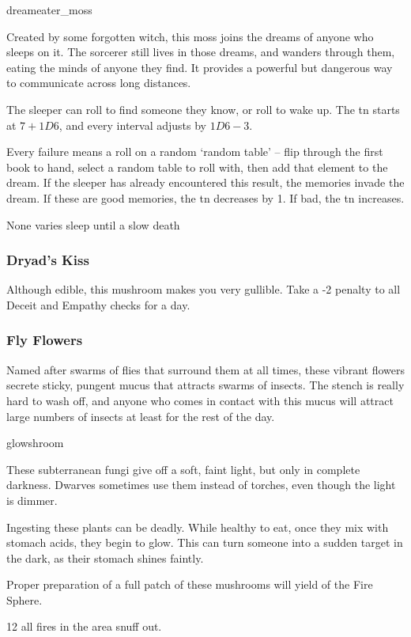 \begin{multicols}{2}
%
  {dreameater_moss}%
  {
    Created by some forgotten witch, this moss joins the dreams of anyone who sleeps on it.
    The sorcerer still lives in those dreams, and wanders through them, eating the minds of anyone they find.
    It provides a powerful but dangerous way to communicate across long distances.

    The sleeper can roll  to find someone they know, or roll  to wake up.
    The \gls{tn} starts at $7 + 1D6$, and every \gls{interval} adjusts by $1D6 - 3$.

    Every failure means a roll on a random `random table' -- flip through the first book to hand, select a random table to roll with, then add that element to the dream.
    If the sleeper has already encountered this result, the memories invade the dream.
    If these are good memories, the \gls{tn} decreases by 1.
    If bad, the \gls{tn} increases.
  }
  {None}%
  {varies}%
  {sleep until a slow death}%

\subsubsection{Dryad's Kiss}
\label{dryads_kiss}

Although edible, this mushroom makes you very gullible.
Take a -2 penalty to all Deceit and Empathy checks for a day.

\subsubsection{Fly Flowers}
\label{fly_flowers}

Named after swarms of flies that surround them at all times, these vibrant flowers secrete sticky, pungent mucus that attracts swarms of insects.
The stench is really hard to wash off, and anyone who comes in contact with this mucus will attract large numbers of insects at least for the rest of the day.

%
  {glowshroom}%
  {
   These subterranean fungi give off a soft, faint light, but only in complete darkness.
   Dwarves sometimes use them instead of torches, even though the light is dimmer.

   Ingesting these plants can be deadly.
   While healthy to eat, once they mix with stomach acids, they begin to glow.
   This can turn someone into a sudden target in the dark, as their stomach shines faintly.

   Proper preparation of a full patch of these mushrooms will yield  of the Fire Sphere.
    }
  {}%
  {12}%
  {all fires in the \gls{area} snuff out.}%


\end{multicols}

